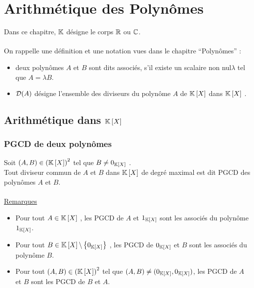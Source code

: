 \chapter{Arithmétique des Polynômes}

\minitoc

Dans ce chapitre, \( \K\) désigne le corps \(\R\) ou \( \C\).\\~\\
On rappelle une définition et une notation vues dans le chapitre “Polynômes” :
\begin{itemize}
    \item  deux polynômes \(A\) et \(B\) sont dits associés, s’il existe un scalaire non nul\( \lambda\)  tel que \(A = \lambda B\).
    \item  \(\cal{D} (A)\) désigne l’ensemble des diviseurs du polynôme \(A\) de \(\K\croch{X}\) dans \(\K\croch{X}\) .
\end{itemize}

\section{Arithmétique dans \(\K\croch{X}\)}
\subsection{PGCD de deux polynômes}
\begin{defi}
    Soit \((A, B) \in \paren{\K\croch{X}}^2\) tel que \(B\neq 0_{\K\croch{X}}\) .\\
    Tout diviseur commun de \(A\) et \(B\) dans \(\K\croch{X}\) de degré maximal est dit PGCD des polynômes \(A\) et \(B\).\\~\\
    \underline{Remarques} \\
    \begin{itemize}
        \item Pour tout \(A \in \K\croch{X}\) , les PGCD de \(A\) et \(1_{\K\croch{X}}\) sont les associés du polynôme \(1_{\K\croch{X}}\).
        \item Pour tout \(B \in \K\croch{X} \pd \accol{0_{\K\croch{X}}}\)  , les PGCD de \(0_{\K\croch{X}}\)  et \(B\) sont les associés du polynôme \(B\).
        \item Pour tout \((A, B) \in \paren{\K\croch{X}}^2\) tel que \((A, B)\neq (0_{\K\croch{X}} , 0_{\K\croch{X}} )\), les PGCD de \(A\) et \(B\) sont les PGCD de \(B\) et \(A\).
    \end{itemize}
\end{defi}

